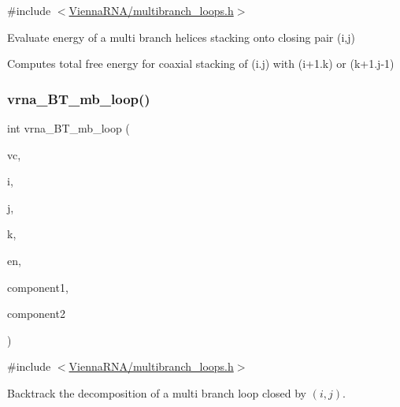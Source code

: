 {\ttfamily \#include $<$\mbox{\hyperlink{multibranch__loops_8h}{Vienna\+R\+N\+A/multibranch\+\_\+loops.\+h}}$>$}



Evaluate energy of a multi branch helices stacking onto closing pair (i,j) 

Computes total free energy for coaxial stacking of (i.\+j) with (i+1.k) or (k+1.j-\/1) \mbox{\label{group__loops_ga9cb520ddfd8b3a48089a7910b045d06b}} 
\subsubsection{\texorpdfstring{vrna\+\_\+\+B\+T\+\_\+mb\+\_\+loop()}{vrna\_BT\_mb\_loop()}}
{\footnotesize\ttfamily int vrna\+\_\+\+B\+T\+\_\+mb\+\_\+loop (\begin{DoxyParamCaption}\item[{\mbox{\hyperlink{group__fold__compound_ga1b0cef17fd40466cef5968eaeeff6166}{vrna\+\_\+fold\+\_\+compound\+\_\+t}} $\ast$}]{vc,  }\item[{int $\ast$}]{i,  }\item[{int $\ast$}]{j,  }\item[{int $\ast$}]{k,  }\item[{int}]{en,  }\item[{int $\ast$}]{component1,  }\item[{int $\ast$}]{component2 }\end{DoxyParamCaption})}



{\ttfamily \#include $<$\mbox{\hyperlink{multibranch__loops_8h}{Vienna\+R\+N\+A/multibranch\+\_\+loops.\+h}}$>$}



Backtrack the decomposition of a multi branch loop closed by $ (i,j) $. 


